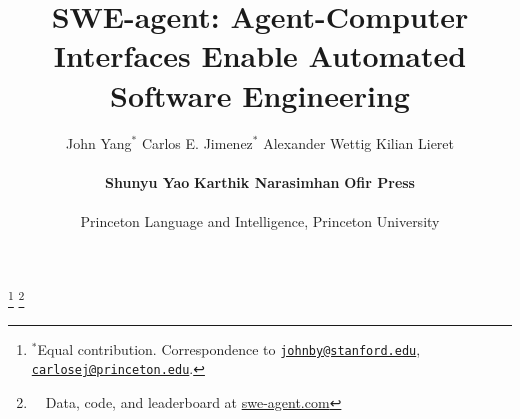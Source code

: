 \documentclass{article}
\title{SWE-agent: Agent-Computer Interfaces Enable Automated Software Engineering}
\author{%
John Yang$^{*}$ \quad Carlos E. Jimenez$^{*}$ \quad Alexander Wettig \quad Kilian Lieret \\
\vspace{-0.6em}\\
\textbf{Shunyu Yao} \quad \textbf{Karthik Narasimhan} \quad \textbf{Ofir Press} \\
\vspace{-0.3em}\\
Princeton Language and Intelligence, Princeton University
}
\begin{document}

\newcommand{\fix}{\marginpar{FIX}}
\newcommand{\new}{\marginpar{NEW}}
\newcommand{\smalltab}{\hspace{10pt}}

\maketitle
\vspace{-2em}

\let\thefootnote\relax\footnote{$^*$Equal contribution. 
Correspondence to \texttt{\href{mailto:johnby@stanford.edu}{johnby@stanford.edu}}, \texttt{\href{mailto:carlosej@princeton.edu}{carlosej@princeton.edu}}.
}
\let\thefootnote\relax\footnote{~~Data, code, and leaderboard at \href{https://swe-agent.com/}{swe-agent.com}}
\vspace{-2em}









\newpage





% 

\newpage
\appendix


\clearpage

\clearpage

\clearpage

\clearpage

\end{document}
